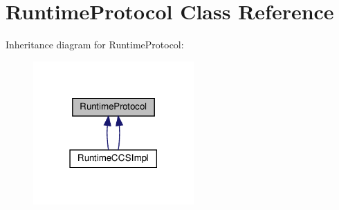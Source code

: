 \hypertarget{classRuntimeProtocol}{}\section{Runtime\+Protocol Class Reference}
\label{classRuntimeProtocol}


Inheritance diagram for Runtime\+Protocol\+:
\nopagebreak
\begin{figure}[H]
\begin{center}
\leavevmode
\includegraphics[width=174pt]{classRuntimeProtocol__inherit__graph}
\end{center}
\end{figure}

